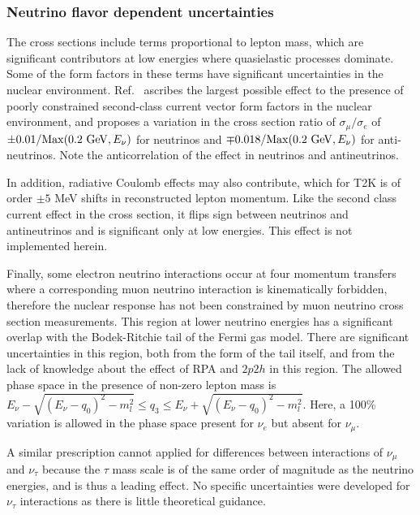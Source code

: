 \subsubsection{Neutrino flavor dependent uncertainties}
The cross sections include terms proportional to lepton mass, which are significant contributors at low energies where quasielastic processes dominate.  Some of the form factors in these terms have significant uncertainties in the nuclear environment.  Ref.~\cite{Day-McFarland:2012} ascribes the largest possible effect to the presence of poorly constrained second-class current vector form factors in the nuclear environment, and proposes a variation in the cross section ratio of $\sigma_\mu/\sigma_e$ of $\pm 0.01/{\rm\textstyle Max}(0.2~{\rm\textstyle GeV},E_\nu)$ for neutrinos and $\mp 0.018/{\rm\textstyle Max}(0.2~ {\rm\textstyle GeV},E_\nu)$ for anti-neutrinos.  Note the anticorrelation of the effect in neutrinos and antineutrinos.

In addition, radiative Coulomb effects may also contribute, which for T2K is of order $\pm5$ MeV shifts in reconstructed lepton momentum.  Like the second class current effect in the cross section, it flips sign between neutrinos and antineutrinos and is significant only at low energies.  This effect is not implemented herein.

Finally, some electron neutrino interactions occur at four momentum transfers where a corresponding muon neutrino interaction is kinematically forbidden, therefore the nuclear response has not been constrained by muon neutrino cross section measurements.  This region at lower neutrino energies has a significant overlap with the Bodek-Ritchie tail of the Fermi gas model. There are significant uncertainties in this region, both from the form of the tail itself, and from the lack of knowledge about the effect of RPA and $2p2h$ in this region. The allowed phase space in the presence of non-zero lepton mass is $E_\nu-\sqrt{\left( E_\nu-q_0\right) ^2-m_l^2}\leq q_3\leq E_\nu+\sqrt{\left( E_\nu-q_0\right) ^2-m_l^2}$. Here, a 100\% variation is allowed in the phase space present for $\nu_e$ but absent for $\nu_\mu$.

A similar prescription cannot applied for differences between interactions of $\nu_\mu$ and $\nu_\tau$ because the $\tau$ mass scale is of the same order of magnitude as the neutrino energies, and is thus a leading effect. No specific uncertainties were developed for $\nu_\tau$ interactions as there is little theoretical guidance.


